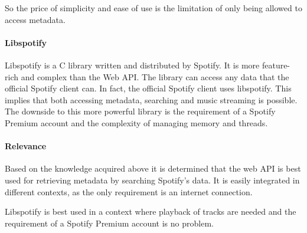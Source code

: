 So the price of simplicity and ease of use is the limitation of only being allowed to access metadata. 

\paragraph{Libspotify}
\label{par:music_catalog_libspotify}

Libspotify is a C library written and distributed by Spotify. It is more feature-rich and complex than the Web API. The library can access any data that the official Spotify client can. In fact, the official Spotify client uses libspotify. This implies that both accessing metadata, searching and music streaming is possible. The downside to this more powerful library is the requirement of a Spotify Premium account and the complexity of managing memory and threads.

\paragraph{Relevance}
\label{par:relevance}

Based on the knowledge acquired above it is determined that the web API is best used for retrieving metadata by searching Spotify's data. It is easily integrated in different contexts, as the only requirement is an internet connection.

Libspotify is best used in a context where playback of tracks are needed and the requirement of a Spotify Premium account is no problem.

